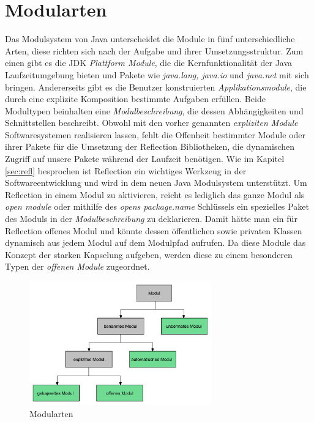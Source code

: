   \section{Modularten} \label{Modularten}
    Das Modulsystem von Java unterscheidet die Module in fünf unterschiedliche Arten, diese richten sich nach der Aufgabe und ihrer Umsetzungsstruktur. Zum einen gibt es die JDK \textit{Plattform Module}, die die Kernfunktionalität der Java Laufzeitumgebung bieten und Pakete wie \textit{java.lang, java.io} und \textit{java.net} mit sich bringen. Andererseits gibt es die Benutzer konstruierten \textit{Applikationsmodule}, die durch eine explizite Komposition bestimmte Aufgaben erfüllen. Beide Modultypen beinhalten eine \textit{Modulbeschreibung}, die dessen Abhängigkeiten und Schnittstellen beschreibt. \newline
    Obwohl mit den vorher genannten \textit{expliziten Module} Softwaresystemen realisieren lassen, fehlt die Offenheit bestimmter Module oder ihrer Pakete für die Umsetzung der Reflection Bibliotheken, die dynamischen Zugriff auf unsere Pakete während der Laufzeit benötigen. Wie im Kapitel \ref{sec:refl} besprochen ist Reflection ein wichtiges Werkzeug in der Softwareentwicklung und wird in dem neuen Java Modulsystem unterstützt. Um Reflection in einem Modul zu aktivieren, reicht es lediglich das ganze Modul als \textit{open module} oder mithilfe des \textit{opens package.name} Schlüssels ein spezielles Paket des Moduls in der \textit{Modulbeschreibung} zu deklarieren. Damit hätte man ein für Reflection offenes Modul und könnte dessen öffentlichen sowie privaten Klassen dynamisch aus jedem Modul auf dem Modulpfad aufrufen. Da diese Module das Konzept der starken Kapselung aufgeben, werden diese zu einem besonderen Typen der \textit{offenen Module} zugeordnet. \cite{modulMitJava9,java9modRevealed,modulProgJava9,explorJava9}

    \begin{figure}[h]
      \centering
      \includegraphics[width=0.7\textwidth]{material/images/module-tree.pdf}
      \caption{Modularten \cite{modulMitJava9}}
      \label{fig:modtree}
    \end{figure}

